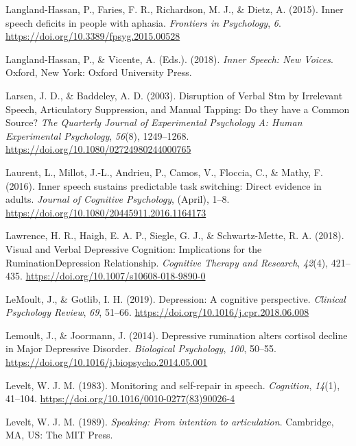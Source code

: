 \documentclass[a4paper,12pt,twoside,openright,oldfontcommands]{memoir}
\begin{document}
\leavevmode\hypertarget{ref-langland-hassan_inner_2015}{}%
Langland-Hassan, P., Faries, F. R., Richardson, M. J., \& Dietz, A. (2015). Inner speech deficits in people with aphasia. \emph{Frontiers in Psychology}, \emph{6}. \url{https://doi.org/10.3389/fpsyg.2015.00528}

\leavevmode\hypertarget{ref-langland-hassan_inner_2018}{}%
Langland-Hassan, P., \& Vicente, A. (Eds.). (2018). \emph{Inner Speech: New Voices}. Oxford, New York: Oxford University Press.

\leavevmode\hypertarget{ref-larsen_disruption_2003}{}%
Larsen, J. D., \& Baddeley, A. D. (2003). Disruption of Verbal Stm by Irrelevant Speech, Articulatory Suppression, and Manual Tapping: Do they have a Common Source? \emph{The Quarterly Journal of Experimental Psychology A: Human Experimental Psychology}, \emph{56}(8), 1249--1268. \url{https://doi.org/10.1080/02724980244000765}

\leavevmode\hypertarget{ref-Laurent2016}{}%
Laurent, L., Millot, J.-L., Andrieu, P., Camos, V., Floccia, C., \& Mathy, F. (2016). Inner speech sustains predictable task switching: Direct evidence in adults. \emph{Journal of Cognitive Psychology}, (April), 1--8. \url{https://doi.org/10.1080/20445911.2016.1164173}

\leavevmode\hypertarget{ref-lawrence_visual_2018}{}%
Lawrence, H. R., Haigh, E. A. P., Siegle, G. J., \& Schwartz-Mette, R. A. (2018). Visual and Verbal Depressive Cognition: Implications for the RuminationDepression Relationship. \emph{Cognitive Therapy and Research}, \emph{42}(4), 421--435. \url{https://doi.org/10.1007/s10608-018-9890-0}

\leavevmode\hypertarget{ref-lemoult_depression_2019}{}%
LeMoult, J., \& Gotlib, I. H. (2019). Depression: A cognitive perspective. \emph{Clinical Psychology Review}, \emph{69}, 51--66. \url{https://doi.org/10.1016/j.cpr.2018.06.008}

\leavevmode\hypertarget{ref-Lemoult2014}{}%
Lemoult, J., \& Joormann, J. (2014). Depressive rumination alters cortisol decline in Major Depressive Disorder. \emph{Biological Psychology}, \emph{100}, 50--55. \url{https://doi.org/10.1016/j.biopsycho.2014.05.001}

\leavevmode\hypertarget{ref-levelt_monitoring_1983}{}%
Levelt, W. J. M. (1983). Monitoring and self-repair in speech. \emph{Cognition}, \emph{14}(1), 41--104. \url{https://doi.org/10.1016/0010-0277(83)90026-4}

\leavevmode\hypertarget{ref-levelt_speaking_1989}{}%
Levelt, W. J. M. (1989). \emph{Speaking: From intention to articulation}. Cambridge, MA, US: The MIT Press.
\end{document}
